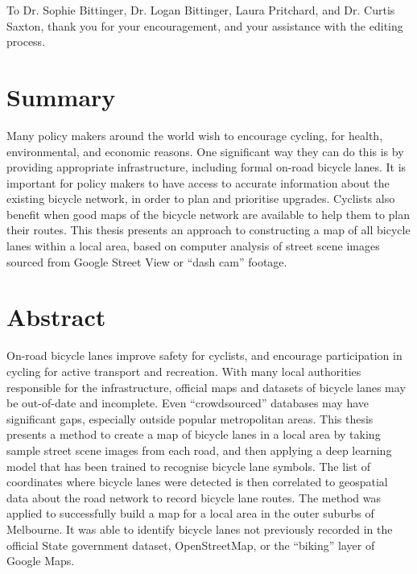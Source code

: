 \documentclass[11pt,twoside]{report}
\begin{document}
To Dr. Sophie Bittinger, Dr. Logan Bittinger, Laura Pritchard, and Dr. Curtis Saxton, thank you for your encouragement, and your assistance with the editing process.


\chapter*{Summary}

Many policy makers around the world wish to encourage cycling, for health, environmental, and economic reasons.  One significant way they can do this is by providing appropriate infrastructure, including formal on-road bicycle lanes.  It is important for policy makers to have access to accurate information about the existing bicycle network, in order to plan and prioritise upgrades.  Cyclists also benefit when good maps of the bicycle network are available to help them to plan their routes.  This thesis presents an approach to constructing a map of all bicycle lanes within a local area, based on computer analysis of street scene  images sourced from Google Street View or ``dash cam'' footage.

\begingroup
\renewcommand{\cleardoublepage}{}
\renewcommand{\clearpage}{}
\chapter*{Abstract}
\endgroup

On-road bicycle lanes improve safety for cyclists, and encourage participation in cycling for active transport and recreation.  With many local authorities responsible for the infrastructure, official maps and datasets of bicycle lanes may be out-of-date and incomplete.  Even ``crowdsourced'' databases may have significant gaps, especially outside popular metropolitan areas.  This thesis presents a method to create a map of bicycle lanes in a local area by taking sample street scene images from each road,  and then applying a deep learning model that has been trained to recognise bicycle lane symbols.  The list of coordinates where bicycle  lanes were detected is then correlated to geospatial data about the road network to record bicycle lane routes.  The method was applied to successfully build a map for a local area in the outer suburbs of Melbourne.  It was able to identify bicycle lanes not previously recorded in the official State government dataset, OpenStreetMap, or the ``biking'' layer of Google Maps.
\end{document}
